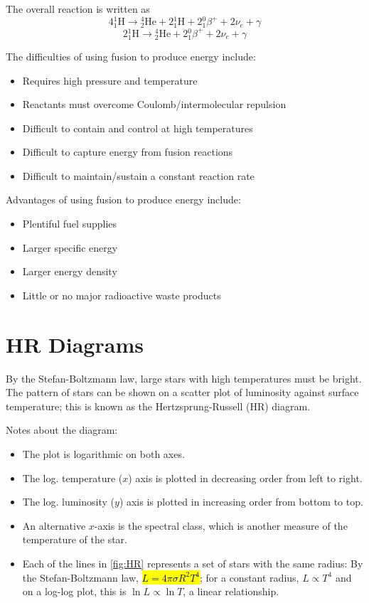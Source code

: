 \documentclass[a4paper,12pt]{article}
\let\oldsection\section
\renewcommand\section{\clearpage\oldsection}
\newcommand{\atom}[3]{{}^{#1}_{#2}\text{#3}}
\begin{document}
\pagebreak

The overall reaction is written as
$$4\atom{1}{1}{H} \rightarrow \atom{4}{2}{He} + 2\atom{1}{1}{H} + 2\atom{0}{1}{$\beta$}^{+} + 2\nu_e + \gamma$$
$$2\atom{1}{1}{H} \rightarrow \atom{4}{2}{He} + 2\atom{0}{1}{$\beta$}^{+} + 2\nu_e + \gamma$$


The difficulties of using fusion to produce energy include:
\begin{itemize}
  \item Requires high pressure and temperature
  \item Reactants must overcome Coulomb/intermolecular repulsion
  \item Difficult to contain and control at high temperatures
  \item Difficult to capture energy from fusion reactions
  \item Difficult to maintain/sustain a constant reaction rate
\end{itemize}

Advantages of using fusion to produce energy include:
\begin{itemize}
  \item Plentiful fuel supplies
  \item Larger specific energy
  \item Larger energy density
  \item Little or no major radioactive waste products
\end{itemize}

\section{HR Diagrams}

By the Stefan-Boltzmann law, large stars with high temperatures must be bright. The pattern of stars can be shown on a scatter plot of luminosity against surface temperature; this is known as the Hertzsprung-Russell (HR) diagram.

Notes about the diagram:
\begin{itemize}
  \item The plot is logarithmic on both axes.
  \item The log. temperature ($x$) axis is plotted in decreasing order from left to right.
  \item The log. luminosity ($y$) axis is plotted in increasing order from bottom to top.
  \item An alternative $x$-axis is the spectral class, which is another measure of the temperature of the star.
  \item Each of the lines in \cref{fig:HR} represents a set of stars with the same radius: By the Stefan-Boltzmann law, \hl{$L = 4\pi\sigma R^2T^4$}; for a constant radius, $L\propto T^4$ and on a log-log plot, this is $\ln L \propto \ln T$, a linear relationship.
\end{itemize}
\end{document}
